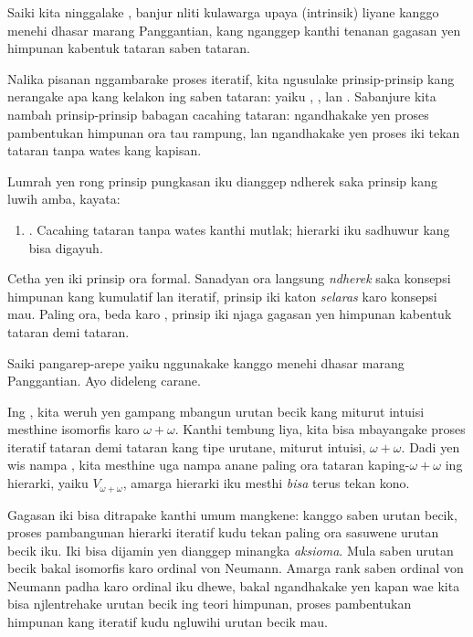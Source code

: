 \documentclass[../../../include/open-logic-section]{subfiles}
\begin{document}

Saiki kita ninggalake \limofsize{}, banjur
nliti kulawarga upaya (intrinsik) liyane
kanggo menehi dhasar marang Panggantian,
kang nganggep kanthi tenanan gagasan yen
himpunan kabentuk tataran saben tataran.

Nalika pisanan nggambarake proses iteratif,
kita ngusulake prinsip-prinsip kang nerangake
apa kang kelakon ing saben tataran: yaiku
\stageshier, \stagesord, lan \stagesacc.
Sabanjure kita nambah prinsip-prinsip babagan
cacahing tataran: \stagessucc{} ngandhakake
yen proses pambentukan himpunan ora tau
rampung, lan \stagesinf{} ngandhakake yen
proses iki tekan tataran tanpa wates kang
kapisan.

Lumrah yen rong prinsip pungkasan iku
dianggep ndherek saka prinsip kang luwih amba,
kayata:
\begin{enumerate}
	\item[] \stagesinex. Cacahing tataran tanpa
	wates kanthi mutlak; hierarki iku sadhuwur
	kang bisa digayuh.
\end{enumerate}
Cetha yen iki prinsip ora formal. Sanadyan
ora langsung \emph{ndherek} saka konsepsi
himpunan kang kumulatif lan iteratif, prinsip
iki katon \emph{selaras} karo konsepsi mau.
Paling ora, beda karo \limofsize, prinsip iki
njaga gagasan yen himpunan kabentuk tataran
demi tataran.

Saiki pangarep-arepe yaiku nggunakake
\stagesinex{} kanggo menehi dhasar marang
Panggantian. Ayo dideleng carane.

Ing , kita weruh
yen gampang mbangun urutan becik kang miturut
intuisi mesthine isomorfis karo
$\omega+\omega$. Kanthi tembung liya, kita
bisa mbayangake proses iteratif tataran demi
tataran kang tipe urutane, miturut intuisi,
$\omega+\omega$. Dadi yen wis nampa
\stagesinex, kita mesthine uga nampa anane
paling ora tataran kaping-$\omega+\omega$
ing hierarki, yaiku $V_{\omega+\omega}$,
amarga hierarki iku mesthi \emph{bisa}
terus tekan kono.

Gagasan iki bisa ditrapake kanthi umum mangkene: kanggo
saben urutan becik, proses pambangunan hierarki
iteratif kudu tekan paling ora sasuwene urutan
becik iku. Iki bisa dijamin yen
dianggep minangka \emph{aksioma}. Mula saben
urutan becik bakal isomorfis karo ordinal von
Neumann. Amarga rank saben ordinal von Neumann
padha karo ordinal iku dhewe,
bakal ngandhakake yen kapan wae kita bisa
njlentrehake urutan becik ing teori himpunan,
proses pambentukan himpunan kang iteratif kudu
ngluwihi urutan becik mau.
\end{document}
